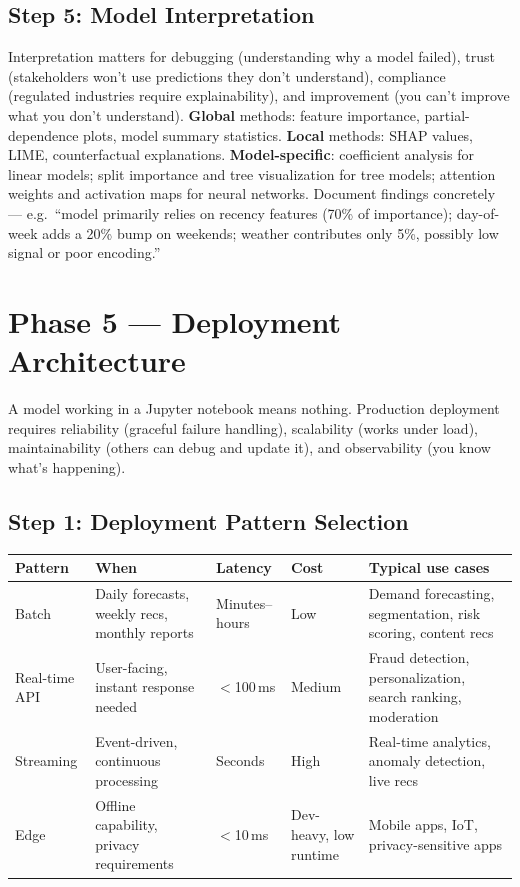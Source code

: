 \subsection{Step 5: Model Interpretation}

Interpretation matters for debugging (understanding why a model failed), trust (stakeholders won't use
predictions they don't understand), compliance (regulated industries require explainability), and improvement
(you can't improve what you don't understand). \textbf{Global} methods: feature importance, partial-dependence
plots, model summary statistics. \textbf{Local} methods: SHAP values, LIME, counterfactual explanations.
\textbf{Model-specific}: coefficient analysis for linear models; split importance and tree visualization for tree
models; attention weights and activation maps for neural networks. Document findings concretely --- e.g.\ ``model
primarily relies on recency features (70\% of importance); day-of-week adds a 20\% bump on weekends; weather
contributes only 5\%, possibly low signal or poor encoding.''

\section{Phase 5 --- Deployment Architecture}

\begin{keytakeaway}
A model working in a Jupyter notebook means nothing. Production deployment requires reliability (graceful failure
handling), scalability (works under load), maintainability (others can debug and update it), and observability
(you know what's happening).
\end{keytakeaway}

\subsection{Step 1: Deployment Pattern Selection}

\begin{longtable}{p{} p{} p{} p{} p{}}
\toprule
\textbf{Pattern} & \textbf{When} & \textbf{Latency} & \textbf{Cost} & \textbf{Typical use cases} \\
\midrule
\endhead
Batch & Daily forecasts, weekly recs, monthly reports & Minutes--hours & Low & Demand forecasting, segmentation,
risk scoring, content recs \\
Real-time API & User-facing, instant response needed & $<$100\,ms & Medium & Fraud detection, personalization,
search ranking, moderation \\
Streaming & Event-driven, continuous processing & Seconds & High & Real-time analytics, anomaly detection, live
recs \\
Edge & Offline capability, privacy requirements & $<$10\,ms & Dev-heavy, low runtime & Mobile apps, IoT,
privacy-sensitive apps \\
\bottomrule
\end{longtable}

